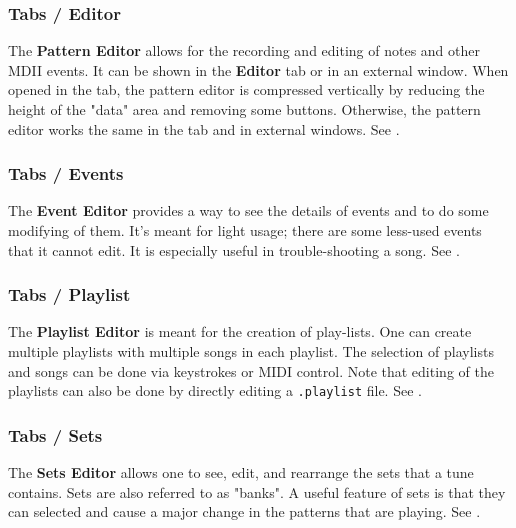 \subsubsection{Tabs / Editor}
\label{subsubsec:introduction_main_tabs_editor}

   The \textbf{Pattern Editor} allows for the recording and editing of
   notes and other MDII events.
   It can be shown in the \textbf{Editor} tab or in an
   external window.  When opened in the tab, the pattern editor is compressed
   vertically by reducing the height of the "data" area and removing some
   buttons.  Otherwise, the pattern editor works the same in the tab and in
   external windows.
   See .

\subsubsection{Tabs / Events}
\label{subsubsec:introduction_main_tabs_events}

   The \textbf{Event Editor} provides a way to see the details of events
   and to do some modifying of them.  It's meant for light usage; there are
   some less-used events that it cannot edit.
   It is especially useful in trouble-shooting a song.
   See .

\subsubsection{Tabs / Playlist}
\label{subsubsec:introduction_main_tabs_playlist}

   The \textbf{Playlist Editor} is meant for the creation of
   play-lists.  One can create multiple playlists with multiple songs in each
   playlist.  The selection of playlists and songs can be done via keystrokes
   or MIDI control.
   Note that editing of the playlists can also be done by directly editing a
   \texttt{.playlist} file.  See .

\subsubsection{Tabs / Sets}
\label{subsubsec:introduction_main_tabs_sets}

   The \textbf{Sets Editor} allows one to see, edit, and rearrange the sets
   that a tune contains.  Sets are also referred to as "banks".
   A useful feature of sets is that they can selected and cause a major change
   in the patterns that are playing.
   See .

